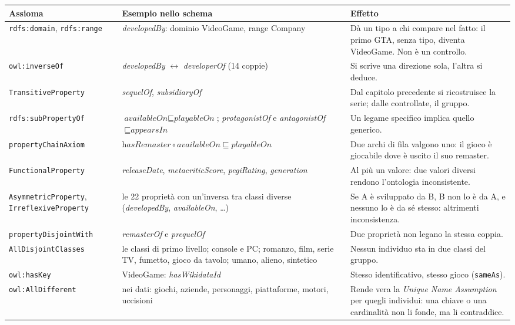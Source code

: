 \documentclass[10pt,a4paper]{article}
\newcommand{\cls}[1]{\textsf{#1}}
\newcommand{\prop}[1]{\textit{#1}}
\begin{document}
\begin{table}[htbp]\centering\footnotesize
\begin{tabularx}{\linewidth}{@{}p{2.7cm}p{3.7cm}Y@{}}
\toprule
Assioma & Esempio nello schema & Effetto \\
\midrule
\texttt{rdfs:domain}, \texttt{rdfs:range} & \prop{developedBy}: dominio \cls{VideoGame}, range \cls{Company} & Dà un tipo a chi compare nel fatto: il primo GTA, senza tipo, diventa \cls{VideoGame}. Non è un controllo. \\
\texttt{owl:inverseOf} & \prop{developedBy} $\leftrightarrow$ \prop{developerOf} (14 coppie) & Si scrive una direzione sola, l'altra si deduce. \\
\texttt{TransitiveProperty} & \prop{sequelOf}, \prop{subsidiaryOf} & Dal capitolo precedente si ricostruisce la serie; dalle controllate, il gruppo. \\
\texttt{rdfs:subPropertyOf} & $\prop{availableOn} \sqsubseteq \prop{playableOn}$; \prop{protagonistOf} e \prop{antagonistOf} $\sqsubseteq \prop{appearsIn}$ & Un legame specifico implica quello generico. \\
\texttt{propertyChainAxiom} & $\prop{hasRemaster} \circ \prop{availableOn} \sqsubseteq \prop{playableOn}$ & Due archi di fila valgono uno: il gioco è giocabile dove è uscito il suo remaster. \\
\texttt{FunctionalProperty} & \prop{releaseDate}, \prop{metacriticScore}, \prop{pegiRating}, \prop{generation} & Al più un valore: due valori diversi rendono l'ontologia inconsistente. \\
\texttt{AsymmetricProperty}, \texttt{IrreflexiveProperty} & le 22 proprietà con un'inversa tra classi diverse (\prop{developedBy}, \prop{availableOn}, \dots) & Se A è sviluppato da B, B non lo è da A, e nessuno lo è da sé stesso: altrimenti inconsistenza. \\
\texttt{propertyDisjointWith} & \prop{remasterOf} e \prop{prequelOf} & Due proprietà non legano la stessa coppia. \\
\texttt{AllDisjointClasses} & le \nTop{} classi di primo livello; console e PC; romanzo, film, serie TV, fumetto, gioco da tavolo; umano, alieno, sintetico & Nessun individuo sta in due classi del gruppo. \\
\texttt{owl:hasKey} & \cls{VideoGame}: \prop{hasWikidataId} & Stesso identificativo, stesso gioco (\texttt{sameAs}). \\
\texttt{owl:AllDifferent} & nei dati: giochi, aziende, personaggi, piattaforme, motori, uccisioni & Rende vera la \emph{Unique Name Assumption} per quegli individui: una chiave o una cardinalità non li fonde, ma li contraddice. \\

\end{tabularx}
\end{table}
\end{document}
